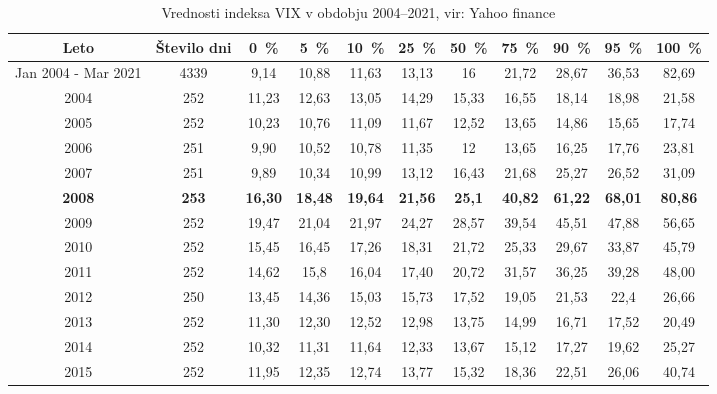 \documentclass[12pt,a4paper, reqno]{amsart}
\theoremstyle{definition} %
\theoremstyle{plain} %
\begin{document}
\begin{table}[h!]
\tiny
   \caption{Vrednosti indeksa VIX v obdobju 2004--2021, vir: Yahoo finance}
  \label{table:Tabela 3}
  \begin{adjustbox}{center}
    \begin{tabular}{|c|c|c|c|c|c|c|c|c|c|c|}
    \hline
    \textbf{Leto} & \multicolumn{1}{c|}{\textbf{Število dni}} & \multicolumn{1}{c|}{\textbf{0~\%}} & \multicolumn{1}{c|}{\textbf{5~\%}} & \multicolumn{1}{c|}{\textbf{10~\%}} & \multicolumn{1}{c|}{\textbf{25~\%}} & \multicolumn{1}{c|}{\textbf{50~\%}} & \multicolumn{1}{c|}{\textbf{75~\%}} & \multicolumn{1}{c|}{\textbf{90~\%}} & \multicolumn{1}{c|}{\textbf{95~\%}} & \multicolumn{1}{c|}{\textbf{100~\%}} \\
    \hline
    Jan 2004 - Mar 2021 & 4339 & 9,14 & 10,88 & 11,63 & 13,13 & 16 & 21,72 & 28,67 & 36,53 & 82,69 \\
    \hline
    2004 & 252 & 11,23 & 12,63 & 13,05 & 14,29 & 15,33 & 16,55 & 18,14 & 18,98 & 21,58 \\
    \hline
    2005 & 252 & 10,23 & 10,76 & 11,09 & 11,67 & 12,52 & 13,65 & 14,86 & 15,65 & 17,74 \\
    \hline
    2006 & 251 & 9,90 & 10,52 & 10,78 & 11,35 & 12 & 13,65 & 16,25 & 17,76 & 23,81 \\
    \hline
    2007 & 251 & 9,89 & 10,34 & 10,99 & 13,12 & 16,43 & 21,68 & 25,27 & 26,52 & 31,09 \\
    \hline
    \textbf{2008} & \textbf{253} & \textbf{16,30} & \textbf{18,48} & \textbf{19,64} & \textbf{21,56} & \textbf{25,1} & \textbf{40,82} & \textbf{61,22} & \textbf{68,01} & \textbf{80,86} \\
    \hline
    2009 & 252 & 19,47 & 21,04 & 21,97 & 24,27 & 28,57 & 39,54 & 45,51 & 47,88 & 56,65 \\
    \hline
    2010 & 252 & 15,45 & 16,45 & 17,26 & 18,31 & 21,72 & 25,33 & 29,67 & 33,87 & 45,79 \\
    \hline
    2011 & 252 & 14,62 & 15,8 & 16,04 & 17,40 & 20,72 & 31,57 & 36,25 & 39,28 & 48,00 \\
    \hline
    2012 & 250 & 13,45 & 14,36 & 15,03 & 15,73 & 17,52 & 19,05 & 21,53 & 22,4 & 26,66 \\
    \hline
    2013 & 252 & 11,30 & 12,30 & 12,52 & 12,98 & 13,75 & 14,99 & 16,71 & 17,52 & 20,49 \\
    \hline
    2014 & 252 & 10,32 & 11,31 & 11,64 & 12,33 & 13,67 & 15,12 & 17,27 & 19,62 & 25,27 \\
    \hline
    2015 & 252 & 11,95 & 12,35 & 12,74 & 13,77 & 15,32 & 18,36 & 22,51 & 26,06 & 40,74 \\

\end{tabular}
\end{adjustbox}
\end{table}
\end{document}

